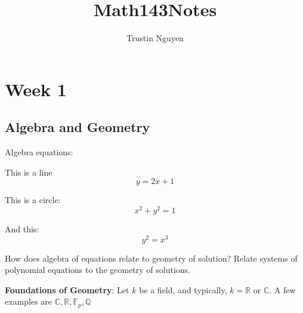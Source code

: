 \documentclass{report}
\title{Math143Notes}
\author{Trustin Nguyen}
\begin{document}
\begin{titlepage}
    \maketitle
\end{titlepage}

\tableofcontents
\restoregeometry

\reversemarginpar

\chapter{Week 1}

\begin{topic}
    \section{Algebra and Geometry}
\end{topic}

\begin{examples}
    Algebra equations:
        \begin{example}
            This is a line
                \begin{equation*}
                    y = 2x + 1
                \end{equation*}
        \end{example}
        \begin{example}
            This is a circle:
                \begin{equation*}
                    x^{2} + y^{2} = 1
                \end{equation*}
        \end{example}

        \begin{example}
            And this:
                \begin{equation*}
                    y^{2} = x^{3}
                \end{equation*}
        \end{example}
    How does algebra of equations relate to geometry of solution? Relate systems of polynomial equations to the geometry of solutions.
\end{examples}

\textbf{Foundations of Geometry}: Let $k$ be a field, and typically, $k = \mathbb{R}$ or $\mathbb{C}$. A few examples are $\mathbb{C}, \mathbb{R}, \mathbb{F}_{p}, \mathbb{Q}$
\end{document}
